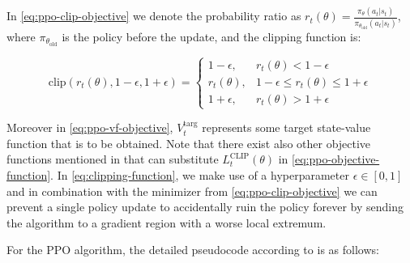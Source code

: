 \noindent In \eqref{eq:ppo-clip-objective} we denote the probability ratio as $r_{t}(\theta) = \frac{\pi_{\theta}\left(a_{t}|s_{t}\right)}{\pi_{\theta_{\text{old}}}(a_{t}|s_{t})}$, where $\pi_{\theta_{\text{old}}}$ is the policy before the update, and the clipping function is:

\begin{equation}
  \text{clip}\left(r_{t}(\theta), 1 - \epsilon, 1 + \epsilon\right) = \begin{cases}
    1 - \epsilon, &r_{t}(\theta) < 1 - \epsilon\\
    r_{t}(\theta), &1 - \epsilon \leq r_{t}(\theta) \leq 1 + \epsilon\\
    1 + \epsilon, &r_{t}(\theta) > 1 + \epsilon
  \end{cases}
  \label{eq:clipping-function}
\end{equation}

\noindent Moreover in \eqref{eq:ppo-vf-objective}, $V_{t}^{\text{targ}}$ represents some target state-value function that is to be obtained. Note that there exist also other objective functions mentioned in \cite{ppo-paper} that can substitute $L_{t}^{\text{CLIP}}(\theta)$ in \eqref{eq:ppo-objective-function}. In \eqref{eq:clipping-function}, we make use of a hyperparameter $\epsilon \in [0, 1]$ and in combination with the minimizer from \eqref{eq:ppo-clip-objective} we can prevent a single policy update to accidentally ruin the policy forever by sending the algorithm to a gradient region with a worse local extremum.

\noindent For the PPO algorithm, the detailed pseudocode according to \cite{ppo-paper} is as follows:

